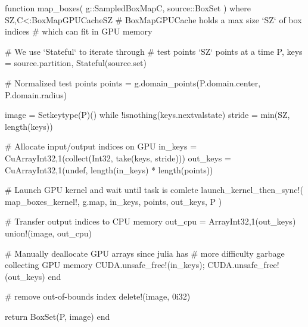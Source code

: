 \begin{jllisting}[language=julia, style=jlcodestyle, label=lst:boxmap_gpu, caption=Function to calculate $f(\mathcal{B})$ with GPU acceleration]
    function map_boxes(
            g::SampledBoxMap{C}, source::BoxSet
        ) where {SZ,C<:BoxMapGPUCache{SZ}}
        # BoxMapGPUCache holds a max size `SZ` of box indices 
        # which can fit in GPU memory

        # We use `Stateful` to iterate through
        # test points `SZ` points at a time
        P, keys = source.partition, Stateful(source.set)

        # Normalized test points
        points = g.domain_points(P.domain.center, P.domain.radius)

        image = Set{keytype(P)}()
        while !isnothing(keys.nextvalstate)
            stride = min(SZ, length(keys))

            # Allocate input/output indices on GPU
            in_keys = CuArray{Int32,1}(collect(Int32, take(keys, stride)))
            out_keys = CuArray{Int32,1}(undef, length(in_keys) * length(points))

            # Launch GPU kernel and wait until task is comlete
            launch_kernel_then_sync!(
                map_boxes_kernel!, 
                g.map, in_keys, points, out_keys, P
            )
            
            # Transfer output indices to CPU memory
            out_cpu = Array{Int32,1}(out_keys)
            union!(image, out_cpu)

            # Manually deallocate GPU arrays since julia has 
            # more difficulty garbage collecting GPU memory
            CUDA.unsafe_free!(in_keys); CUDA.unsafe_free!(out_keys)
        end

        # remove out-of-bounds index
        delete!(image, 0i32)

        return BoxSet(P, image)
    end
\end{jllisting}

